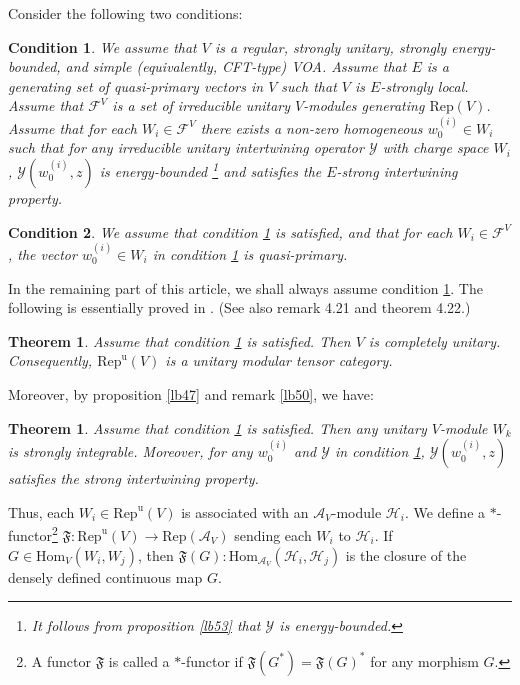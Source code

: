 \documentclass[12pt,a4paper]{article}
\theoremstyle{definition}
\theoremstyle{plain}
\newtheorem{thm}[df]{Theorem}
\newtheorem{cond}{Condition}
\newcommand{\fk}{\mathfrak}
\newcommand{\mc}{\mathcal}
\newcommand{\Hom}{\mathrm{Hom}}
\newcommand{\Rep}{\mathrm{Rep}}
\newcommand{\RepV}{\mathrm{Rep}(V)}
\newcommand{\RepuV}{\mathrm{Rep}^{\mathrm u}(V)}
\numberwithin{equation}{subsection}
\begin{document}
Consider the following two conditions:

\begin{cond}\label{cd1}
We assume that $V$ is a regular, strongly unitary, strongly energy-bounded, and simple (equivalently, CFT-type) VOA. Assume that $E$ is a generating set of quasi-primary vectors in $V$ such that $V$ is $E$-strongly local. Assume that $\mc F^V$ is a set of irreducible unitary $V$-modules generating $\RepV$. Assume that for each $W_i\in \mc F^V$ there exists a non-zero homogeneous $w^{(i)}_0\in W_i$ such that for any irreducible unitary intertwining operator $\mc Y$ with charge space $W_i$, $\mc Y(w^{(i)}_0,z)$ is energy-bounded \footnote{It follows from proposition \ref{lb53} that $\mc Y$ is energy-bounded.} and satisfies the $E$-strong intertwining property.
\end{cond}

\begin{cond}\label{cd2}
We assume that condition \ref{cd1} is satisfied, and that for each $W_i\in\mc F^V$, the vector $w^{(i)}_0\in W_i$ in condition \ref{cd1} is quasi-primary.
\end{cond}

In the remaining part of this article,  we shall always assume  condition \ref{cd1}. The following is essentially proved in \cite{Gui19b}. (See also \cite{Gui21a} remark 4.21 and theorem 4.22.)

\begin{thm}\label{lb51}
Assume that condition \ref{cd1} is satisfied.  Then $V$ is completely unitary. Consequently, $\RepuV$ is a unitary modular tensor category.
\end{thm} 

Moreover, by proposition \ref{lb47} and remark \ref{lb50}, we have:

\begin{thm}\label{lb55}
Assume that condition \ref{cd1} is satisfied. Then any unitary $V$-module $W_k$ is strongly integrable. Moreover, for any $w^{(i)}_0$ and $\mc Y$ in condition \ref{cd1}, $\mc Y(w^{(i)}_0,z)$ satisfies the strong intertwining property.
\end{thm}




Thus,  each $W_i\in\RepuV$ is associated with an $\mc A_V$-module $\mc H_i$. We define a $*$-functor\footnote{A functor $\fk F$ is called a $*$-functor if $\fk F(G^*)=\fk F(G)^*$ for any morphism $G$.} $\fk F:\RepuV\rightarrow \Rep(\mc A_V)$ sending each $W_i$ to $\mc H_i$. If $G\in\Hom_V(W_i,W_j)$, then $\fk F(G):\Hom_{\mc A_V}(\mc H_i,\mc H_j)$ is the closure of the densely defined continuous map $G$.
\end{document}
